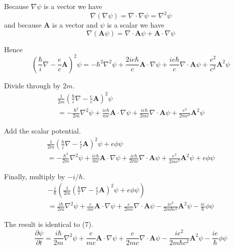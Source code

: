 \documentclass[12pt]{article}
\begin{document}
Because $\nabla\psi$ is a vector we have
\begin{equation*}
\nabla(\nabla\psi)=\nabla\cdot\nabla\psi=\nabla^2\psi
\end{equation*}
and because $\mathbf A$ is a vector and $\psi$ is a scalar we have
\begin{equation*}
\nabla(\mathbf A\psi)=\nabla\cdot\mathbf A\psi+\mathbf A\cdot\nabla\psi
\end{equation*}

Hence
\begin{equation*}
\left(\frac{\hbar}{i}\nabla-\frac{e}{c}\mathbf A\right)^2\psi
=-\hbar^2\nabla^2\psi
+\frac{2ie\hbar}{c}\mathbf A\cdot\nabla\psi
+\frac{ie\hbar}{c}\nabla\cdot\mathbf A\psi
+\frac{e^2}{c^2}\mathbf A^2\psi
\end{equation*}

Divide through by $2m$.
\begin{multline*}
\frac{1}{2m}\left(\frac{\hbar}{i}\nabla-\frac{e}{c}\mathbf A\right)^2\psi
\\
=-\frac{\hbar^2}{2m}\nabla^2\psi
+\frac{ie\hbar}{mc}\mathbf A\cdot\nabla\psi
+\frac{ie\hbar}{2mc}\nabla\cdot\mathbf A\psi
+\frac{e^2}{2mc^2}\mathbf A^2\psi
\end{multline*}

Add the scalar potential.
\begin{multline*}
\frac{1}{2m}\left(\frac{\hbar}{i}\nabla-\frac{e}{c}\mathbf A\right)^2\psi+e\phi\psi
\\
=-\frac{\hbar^2}{2m}\nabla^2\psi
+\frac{ie\hbar}{mc}\mathbf A\cdot\nabla\psi
+\frac{ie\hbar}{2mc}\nabla\cdot\mathbf A\psi
+\frac{e^2}{2mc^2}\mathbf A^2\psi
+e\phi\psi
\end{multline*}

Finally, multiply by $-i/\hbar$.
\begin{multline*}
-\frac{i}{\hbar}\left(
\frac{1}{2m}\left(\frac{\hbar}{i}\nabla-\frac{e}{c}\mathbf A\right)^2\psi+e\phi\psi
\right)
\\
=\frac{i\hbar}{2m}\nabla^2\psi
+\frac{e}{mc}\mathbf A\cdot\nabla\psi
+\frac{e}{2mc}\nabla\cdot\mathbf A\psi
-\frac{ie^2}{2m\hbar c^2}\mathbf A^2\psi
-\frac{ie}{\hbar}\phi\psi
\end{multline*}

The result is identical to (7).
\begin{equation*}
\frac{\partial\psi}{\partial t}
=\frac{i\hbar}{2m}\nabla^2\psi
+\frac{e}{mc}\mathbf A\cdot\nabla\psi
+\frac{e}{2mc}\nabla\cdot\mathbf A\psi
-\frac{ie^2}{2m\hbar c^2}\mathbf A^2\psi
-\frac{ie}{\hbar}\phi\psi
\tag{7}
\end{equation*}
\end{document}
